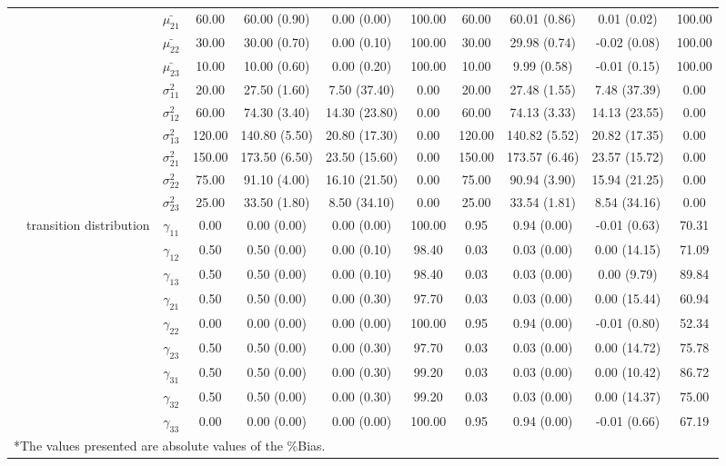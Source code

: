 \begin{table}[h]
{\begin{tabular}{ccccccccccc}
 &  & $\bar{\mu_{21}}$ & 60.00 & 60.00 (0.90) & 0.00 (0.00) & 100.00 & 60.00 & 60.01 (0.86) & 0.01 (0.02) & 100.00 \\
 &  & $\bar{\mu_{22}}$ & 30.00 & 30.00 (0.70) & 0.00 (0.10) & 100.00 & 30.00 & 29.98 (0.74) & -0.02 (0.08) & 100.00 \\
 &  & $\bar{\mu_{23}}$ & 10.00 & 10.00 (0.60) & 0.00 (0.20) & 100.00 & 10.00 & 9.99 (0.58) & -0.01 (0.15) & 100.00 \\
 &  & $\sigma^2_{11}$ & 20.00 & 27.50 (1.60) & 7.50 (37.40) & 0.00 & 20.00 & 27.48 (1.55) & 7.48 (37.39) & 0.00 \\
 &  & $\sigma^2_{12}$ & 60.00 & 74.30 (3.40) & 14.30 (23.80) & 0.00 & 60.00 & 74.13 (3.33) & 14.13 (23.55) & 0.00 \\
 &  & $\sigma^2_{13}$ & 120.00 & 140.80 (5.50) & 20.80 (17.30) & 0.00 & 120.00 & 140.82 (5.52) & 20.82 (17.35) & 0.00 \\
 &  & $\sigma^2_{21}$ & 150.00 & 173.50 (6.50) & 23.50 (15.60) & 0.00 & 150.00 & 173.57 (6.46) & 23.57 (15.72) & 0.00 \\
 &  & $\sigma^2_{22}$ & 75.00 & 91.10 (4.00) & 16.10 (21.50) & 0.00 & 75.00 & 90.94 (3.90) & 15.94 (21.25) & 0.00 \\
 &  & $\sigma^2_{23}$ & 25.00 & 33.50 (1.80) & 8.50 (34.10) & 0.00 & 25.00 & 33.54 (1.81) & 8.54 (34.16) & 0.00 \\
 & transition distribution & $\gamma_{11}$ & 0.00 & 0.00 (0.00) & 0.00 (0.00) & 100.00 & 0.95 & 0.94 (0.00) & -0.01 (0.63) & 70.31 \\
 & \multirow{8}{*}{} & $\gamma_{12}$ & 0.50 & 0.50 (0.00) & 0.00 (0.10) & 98.40 & 0.03 & 0.03 (0.00) & 0.00 (14.15) & 71.09 \\
 &  & $\gamma_{13}$ & 0.50 & 0.50 (0.00) & 0.00 (0.10) & 98.40 & 0.03 & 0.03 (0.00) & 0.00 (9.79) & 89.84 \\
 &  & $\gamma_{21}$ & 0.50 & 0.50 (0.00) & 0.00 (0.30) & 97.70 & 0.03 & 0.03 (0.00) & 0.00 (15.44) & 60.94 \\
 &  & $\gamma_{22}$ & 0.00 & 0.00 (0.00) & 0.00 (0.00) & 100.00 & 0.95 & 0.94 (0.00) & -0.01 (0.80) & 52.34 \\
 &  & $\gamma_{23}$ & 0.50 & 0.50 (0.00) & 0.00 (0.30) & 97.70 & 0.03 & 0.03 (0.00) & 0.00 (14.72) & 75.78 \\
 &  & $\gamma_{31}$ & 0.50 & 0.50 (0.00) & 0.00 (0.30) & 99.20 & 0.03 & 0.03 (0.00) & 0.00 (10.42) & 86.72 \\
 &  & $\gamma_{32}$ & 0.50 & 0.50 (0.00) & 0.00 (0.30) & 99.20 & 0.03 & 0.03 (0.00) & 0.00 (14.37) & 75.00 \\
 &  & $\gamma_{33}$ & 0.00 & 0.00 (0.00) & 0.00 (0.00) & 100.00 & 0.95 & 0.94 (0.00) & -0.01 (0.66) & 67.19 \\

\bottomrule 
\multicolumn{10}{l}{*The values presented are absolute values of the \%Bias.}
\end{tabular}}
\label{tgr2_3}
\end{table}


